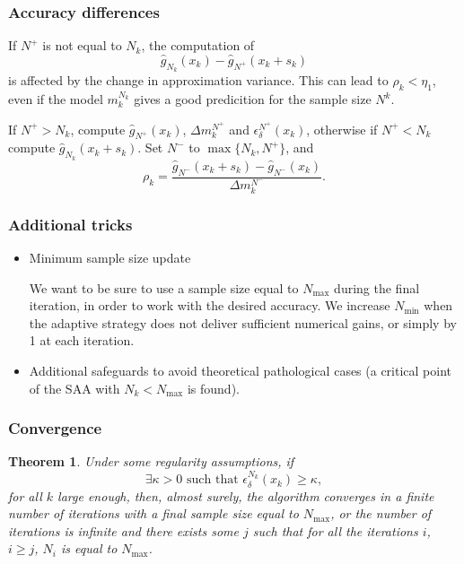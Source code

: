 \documentclass{beamer}
\newtheorem{theo}{Theorem}
\begin{document}
\begin{frame}
\frametitle{Accuracy differences}

If $N^+$ is not equal to $N_k$, the computation of
\[
 \hat{g}_{N_k} (x_k) - \hat{g}_{N^+} ( x_k + s_k )
\]
is affected by the change in approximation variance.
This can lead to $\rho_k < \eta_1$, even if the model $m_k^{N_k}$ gives a good predicition for the sample size $N^k$.



\mbox{}

If $N^+ > N_k$, compute $\hat{g}_{N^+}(x_k)$, $\Delta m_k^{N^+}$ and
$\epsilon_{\delta}^{N^+}(x_k)$, otherwise if $N^+ < N_k$ compute $\hat{g}_{N_k}(x_k + s_k)$.
Set $N^-$ to $\max\lbrace N_k, N^+ \rbrace$, and %
\[
\rho_k = \frac{\hat{g}_{N^-}(x_k+s_k) - \hat{g}_{N^-}(x_k)}{\Delta
m_k^{N^-}}.
\]

\end{frame}

\begin{frame}
\frametitle{Additional tricks}

\begin{itemize}
\item Minimum sample size update

We want to be sure to use a sample size equal to $N_{\max}$ during the final iteration, in order to work with the desired accuracy.
We increase $N_{\min}$ when the adaptive strategy does not deliver sufficient numerical gains, or simply by 1 at each iteration.

\item
Additional safeguards to avoid theoretical pathological cases (a critical point of the SAA with $N_k < N_{\max}$ is found).
\end{itemize}

\end{frame}

\begin{frame}
\frametitle{Convergence}

\begin{theo}
Under some regularity assumptions, if
\[
\exists \kappa > 0\text{ such that }
\epsilon_{\delta}^{N_k}(x_k) \geq \kappa,
\]
for all $k$ large enough, then, almost surely, the algorithm converges in a finite number of iterations with a final sample size equal to $N_{\max}$, or the number of iterations is infinite and there exists some $j$ such that for all the iterations $i$, $i \geq j$, $N_i$ is equal to $N_{\max}$.
\end{theo}

\end{frame}
\end{document}
